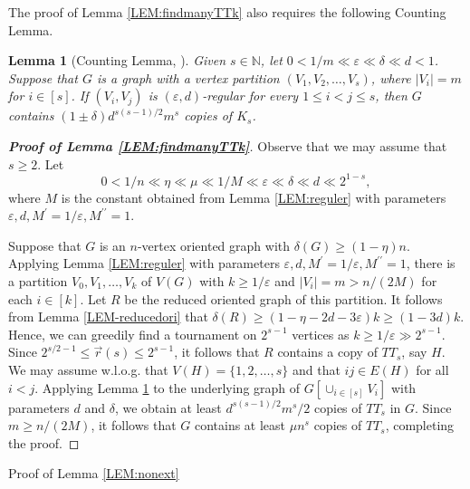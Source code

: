 \documentclass[11pt,a4paper,reqno]{amsart}
\makeatletter
\renewcommand\section{\@startsection{section}{1}%
  \z@{-1.0\linespacing\@plus-.7\linespacing}{1\linespacing}%
  {\normalfont\bfseries\large\centering}}
\newtheorem{lemma}[theorem]{Lemma}
\theoremstyle{definition} %
\makeatother
\begin{document}
The proof of Lemma \ref{LEM:findmanyTTk} also requires the following Counting Lemma.

\begin{lemma}[Counting Lemma, \cite{nagleRSA28}]\label{LEM-count}
Given $s\in \mathbb{N}$, let $0<1/m\ll \varepsilon\ll \delta \ll d<1$. Suppose that $G$ is a graph with a vertex partition $(V_1,V_2,\ldots,V_s)$, where $|V_i|=m$ for  $i\in[s]$. If $(V_i,V_j)$ is $(\varepsilon,d)$-regular for every $1\leqslant i < j \leqslant s$, then $G$ contains $(1\pm \delta)d^{s(s-1)/2}m^s$ copies of $K_s$.
\end{lemma}

\begin{proof}[\textbf{Proof of Lemma \ref{LEM:findmanyTTk}}]
Observe that we may assume that $s \geqslant 2$. Let
$$0<1/n\ll\eta\ll\mu\ll 1/M\ll\varepsilon\ll \delta\ll d\ll 2^{1-s},$$
where $M$ is the constant obtained from Lemma \ref{LEM:reguler} with parameters $\varepsilon,d,M^\prime=1/\varepsilon,M^{\prime\prime}=1$. 

Suppose that $G$ is an $n$-vertex oriented graph with $\delta(G)\geqslant (1-\eta)n$. Applying Lemma \ref{LEM:reguler} with parameters $\varepsilon,d,M^\prime=1/\varepsilon,M^{\prime\prime}=1$, there is a partition $V_0,V_1,\ldots,V_{k}$ of $V(G)$ with $k\geqslant 1/\varepsilon$ and $|V_i|=m>n/(2M)$ for each $i\in [k]$. Let $R$ be the reduced oriented graph of this partition. It follows from Lemma \ref{LEM-reducedori} that
$\delta(R)\geqslant (1-\eta-2d-3\varepsilon)k\geqslant (1-3d)k$.
Hence, we can greedily find a tournament on $2^{s-1}$ vertices as $k\geqslant 1/\varepsilon\gg 2^{s-1}$. 
Since $2^{s/2-1}\leqslant \overrightarrow{r}(s)\leqslant 2^{s-1}$, it follows that $R$ contains a copy of $TT_s$, say $H$.
We may assume w.l.o.g. that $V(H)=\{1,2,\ldots, s\}$ and that $ij\in E(H)$ for all $i<j$. Applying Lemma \ref{LEM-count} to the underlying graph of $G[\cup_{i\in[s]}V_i]$ with parameters $d$ and $\delta$, we obtain at least $d^{s(s-1)/2}m^s/2$ copies of $TT_s$ in $G$. Since $m\geqslant n/(2M)$, it follows that $G$ contains at least $\mu n^s$ copies of $TT_s$, completing the proof.
\end{proof}




\section{Proof of Lemma \ref{LEM:nonext}}\label{SEC-5.2}
\end{document}
